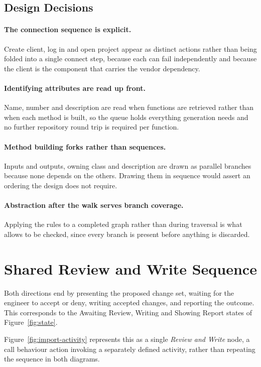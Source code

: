 \subsection{Design Decisions}

\paragraph{The connection sequence is explicit.}
Create client, log in and open project appear as distinct actions rather than
being folded into a single connect step, because each can fail independently and
because the client is the component that carries the vendor dependency.

\paragraph{Identifying attributes are read up front.}
Name, number and description are read when functions are retrieved rather than
when each method is built, so the queue holds everything generation needs and no
further repository round trip is required per function.

\paragraph{Method building forks rather than sequences.}
Inputs and outputs, owning class and description are drawn as parallel branches
because none depends on the others. Drawing them in sequence would assert an
ordering the design does not require.

\paragraph{Abstraction after the walk serves branch coverage.}
Applying the rules to a completed graph rather than during traversal is what
allows  to be checked, since every branch is present before anything
is discarded.

\section{Shared Review and Write Sequence}
\label{sec:shared-tail}

Both directions end by presenting the proposed change set, waiting for the
engineer to accept or deny, writing accepted changes, and reporting the outcome.
This corresponds to the Awaiting Review, Writing and Showing Report states of
Figure~\ref{fig:state}.

Figure~\ref{fig:import-activity} represents this as a single \emph{Review and
Write} node, a call behaviour action invoking a separately defined activity,
rather than repeating the sequence in both diagrams.
